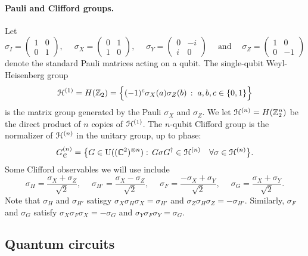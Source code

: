 \paragraph{Pauli and Clifford groups.}
Let 
\begin{equation}\label{eq:pauli-matrix}
\sigma_I = \begin{pmatrix} 1 & 0 \\ 0 & 1 \end{pmatrix},\quad\; \sigma_X = \begin{pmatrix} 0 & 1 \\ 1 & 0 \end{pmatrix},\quad\; \sigma_Y = \begin{pmatrix} 0 & -i \\ i & 0 \end{pmatrix}\quad\;\text{and}\quad\; \sigma_Z = \begin{pmatrix} 1 & 0 \\ 0 & -1\end{pmatrix}
\end{equation}
denote the standard Pauli matrices acting on a qubit.  The single-qubit Weyl-Heisenberg group
$${\mathcal{H}^{(1)}} = H(\mathbb{Z}_2)=\Big\{(-1)^c\sigma_X(a)\sigma_Z(b)\,:\;a,b,c\in\{0,1\}\Big\} $$
is the matrix group generated by the Pauli $\sigma_X$ and $\sigma_Z$. We let ${\mathcal{H}^{(n)}} = H(\mathbb{Z}_2^n)$ be the direct product of $n$ copies of ${\mathcal{H}^{(1)}}$.  
The $n$-qubit Clifford group is the normalizer of ${\mathcal{H}^{(n)}}$ in the unitary group, up to phase: 
$$G_\mathcal{C}^{(n)} = \big\{G\in\mathrm{U}((\mathbb{C}^2)^{\otimes n}):\, G \sigma G^\dagger \in {\mathcal{H}^{(n)}} \quad\forall \sigma \in {\mathcal{H}^{(n)}}\big\}.$$
Some Clifford observables we will use include 
\begin{equation}\label{eq:pauli-matrix-2}
 \sigma_H = \frac{\sigma_X+\sigma_Z}{\sqrt{2}},\quad\; \sigma_{H'} = \frac{\sigma_X-\sigma_Z}{\sqrt{2}},\quad\; \sigma_F = \frac{-\sigma_X+\sigma_Y}{\sqrt{2}},\quad\; \sigma_{G} = \frac{\sigma_X+\sigma_Y}{\sqrt{2}}.
\end{equation}
Note that  $\sigma_H$ and $\sigma_{H'}$ satisgy $\sigma_X \sigma_H \sigma_X = \sigma_{H'}$ and $\sigma_Z \sigma_H \sigma_Z = -\sigma_{H'}$. Similarly, $\sigma_F$ and $\sigma_G$ satisfy $\sigma_X \sigma_F \sigma_X = -\sigma_G$ and $\sigma_Y \sigma_F \sigma_Y = \sigma_G$. 



\subsection{Quantum circuits} 

